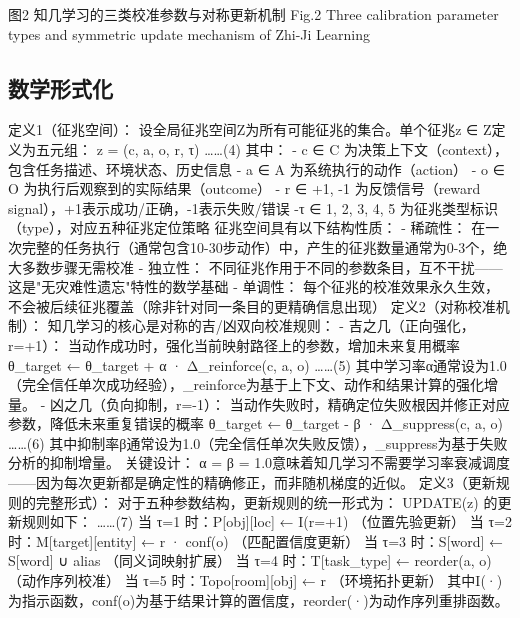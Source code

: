 \documentclass[12pt,a4paper]{article}
\begin{document}
图2  知几学习的三类校准参数与对称更新机制
Fig.2  Three calibration parameter types and symmetric update mechanism of Zhi-Ji Learning

\subsection{数学形式化}
定义1（征兆空间）： 设全局征兆空间Z为所有可能征兆的集合。单个征兆z ∈ Z定义为五元组：
z = (c, a, o, r, τ)  ……(4)
其中：
- c ∈ C 为决策上下文（context），包含任务描述、环境状态、历史信息
- a ∈ A 为系统执行的动作（action）
- o ∈ O 为执行后观察到的实际结果（outcome）
- r ∈ {+1, -1} 为反馈信号（reward signal），+1表示成功/正确，-1表示失败/错误
-τ ∈ {1, 2, 3, 4, 5} 为征兆类型标识（type），对应五种征兆定位策略
征兆空间具有以下结构性质：
- 稀疏性： 在一次完整的任务执行（通常包含10-30步动作）中，产生的征兆数量通常为0-3个，绝大多数步骤无需校准
- 独立性： 不同征兆作用于不同的参数条目，互不干扰——这是"无灾难性遗忘"特性的数学基础
- 单调性： 每个征兆的校准效果永久生效，不会被后续征兆覆盖（除非针对同一条目的更精确信息出现）
定义2（对称校准机制）： 知几学习的核心是对称的吉/凶双向校准规则：
- 吉之几（正向强化，r=+1）： 当动作成功时，强化当前映射路径上的参数，增加未来复用概率
θ\_target ← θ\_target + α · Δ\_reinforce(c, a, o)  ……(5)
其中学习率α通常设为1.0（完全信任单次成功经验），\_reinforce为基于上下文、动作和结果计算的强化增量。
- 凶之几（负向抑制，r=-1）： 当动作失败时，精确定位失败根因并修正对应参数，降低未来重复错误的概率
θ\_target ← θ\_target - β · Δ\_suppress(c, a, o)  ……(6)
其中抑制率β通常设为1.0（完全信任单次失败反馈），\_suppress为基于失败分析的抑制增量。
关键设计： α = β = 1.0意味着知几学习不需要学习率衰减调度——因为每次更新都是确定性的精确修正，而非随机梯度的近似。
定义3（更新规则的完整形式）： 对于五种参数结构，更新规则的统一形式为：
UPDATE(z) 的更新规则如下：  ……(7)
当 τ=1 时：P[obj][loc] ← I(r=+1)  （位置先验更新）
当 τ=2 时：M[target][entity] ← r · conf(o)  （匹配置信度更新）
当 τ=3 时：S[word] ← S[word] ∪ {alias}  （同义词映射扩展）
当 τ=4 时：T[task\_type] ← reorder(a, o)  （动作序列校准）
当 τ=5 时：Topo[room][obj] ← r  （环境拓扑更新）
其中I(·)为指示函数，conf(o)为基于结果计算的置信度，reorder(·)为动作序列重排函数。
\end{document}

